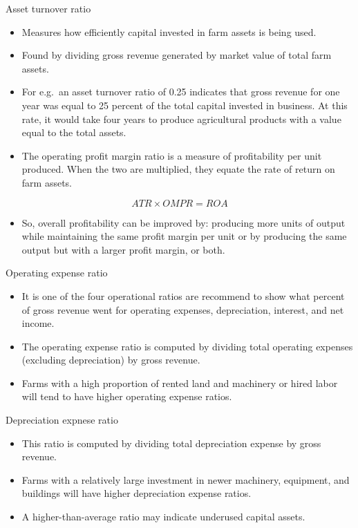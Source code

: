\documentclass[12pt,ignorenonframetext,aspectratio=169]{beamer}
\providecommand{\tightlist}{%
  \setlength{\itemsep}{0pt}\setlength{\parskip}{0pt}}
\begin{document}
\begin{frame}{Asset turnover ratio}
\protect\hypertarget{asset-turnover-ratio}{}
\footnotesize

\begin{itemize}
\tightlist
\item
  Measures how efficiently capital invested in farm assets is being
  used.
\item
  Found by dividing gross revenue generated by market value of total
  farm assets.
\item
  For e.g.~an asset turnover ratio of 0.25 indicates that gross revenue
  for one year was equal to 25 percent of the total capital invested in
  business. At this rate, it would take four years to produce
  agricultural products with a value equal to the total assets.
\item
  The operating profit margin ratio is a measure of profitability per
  unit produced. When the two are multiplied, they equate the rate of
  return on farm assets.
\end{itemize}

\[
ATR \times OMPR = ROA
\]

\begin{itemize}
\tightlist
\item
  So, overall profitability can be improved by: producing more units of
  output while maintaining the same profit margin per unit or by
  producing the same output but with a larger profit margin, or both.
\end{itemize}
\end{frame}

\begin{frame}{Operating expense ratio}
\protect\hypertarget{operating-expense-ratio}{}
\begin{itemize}
\tightlist
\item
  It is one of the four operational ratios are recommend to show what
  percent of gross revenue went for operating expenses, depreciation,
  interest, and net income.
\item
  The operating expense ratio is computed by dividing total operating
  expenses (excluding depreciation) by gross revenue.
\item
  Farms with a high proportion of rented land and machinery or hired
  labor will tend to have higher operating expense ratios.
\end{itemize}
\end{frame}

\begin{frame}{Depreciation expnese ratio}
\protect\hypertarget{depreciation-expnese-ratio}{}
\begin{itemize}
\tightlist
\item
  This ratio is computed by dividing total depreciation expense by gross
  revenue.
\item
  Farms with a relatively large investment in newer machinery,
  equipment, and buildings will have higher depreciation expense ratios.
\item
  A higher-than-average ratio may indicate underused capital assets.
\end{itemize}
\end{frame}
\end{document}
